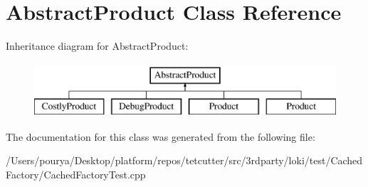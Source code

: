\hypertarget{classAbstractProduct}{}\section{Abstract\+Product Class Reference}
\label{classAbstractProduct}
Inheritance diagram for Abstract\+Product\+:\begin{figure}[H]
\begin{center}
\leavevmode
\includegraphics[height=2.000000cm]{classAbstractProduct}
\end{center}
\end{figure}


The documentation for this class was generated from the following file\+:\begin{DoxyCompactItemize}
\item 
/\+Users/pourya/\+Desktop/platform/repos/tetcutter/src/3rdparty/loki/test/\+Cached\+Factory/Cached\+Factory\+Test.\+cpp\end{DoxyCompactItemize}
